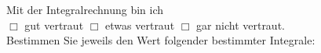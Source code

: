 \documentclass[12pt,answers]{exam}
\begin{document}
\begin{questions}
\begin{solution}
\begin{parts}
\end{parts}
\end{solution}
\pagebreak
{}

Mit der Integralrechnung bin ich \\ $\Box$ gut vertraut \hfill $\Box$ etwas vertraut \hfill $\Box$ gar nicht vertraut. \\[2ex]
Bestimmen Sie jeweils den Wert folgender bestimmter Integrale:\\
\begin{solution}
\begin{parts}

\part \[\int_a^b x {\rm ~d}x = \left[\frac{1}{2}x^2\right]^b_a =\frac{b^2-a^2}{2}
~~~~~~~~~~~~~~~~~~~~~~~~~~~~~~~~~~~~~~~~~~~~~~~~~~~~~~~~~~~~~~~~~~~~~~~~~~~~\]

\part \[\int_0^x {\rm e}^{at} {\rm ~d}t = \left[\frac{1}{a}{\rm e}^{at}\right]^x_0 =\frac{{\rm e}^{ax}-1}{a},\quad a\neq 0
~~~~~~~~~~~~~~~~~~~~~~~~~~~~~~~~~~~~~~~~~~~~~~~~~~~~~~~~~~~~~~~~~~~~~~~~~~~~\]

\part \[\int_0^\pi \sin u {\rm ~d}u = \left[-\cos(u)\right]^\pi_0 = 2
~~~~~~~~~~~~~~~~~~~~~~~~~~~~~~~~~~~~~~~~~~~~~~~~~~~~~~~~~~~~~~~~~~~~~~~~~~~~\]

\part \[
	\int_1^{\Lambda} \frac{w-1}{w^2-1} {\rm ~d}w = \int_1^{\Lambda} \frac{1}{w+1} {\rm ~d}w = \left[\ln(w+1)\right]^\Lambda_1 = \ln\left(\frac{\Lambda+1}{2}\right),\quad \Lambda> -1
~~~~~~~~~~~~~~~~~~~~~~~~~~~~~~~~~~~~~~~~~~~~~~~~~~~~~~~~~~~~~~~~~~~~~~~~~~~~\]
\end{parts}
\end{solution}
\end{questions}
\end{document}
